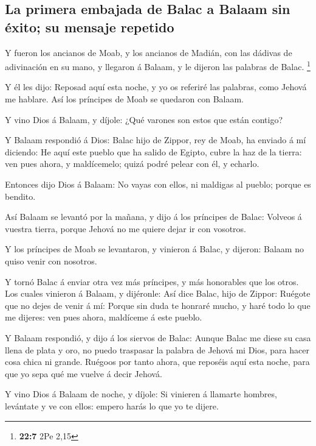\hypertarget{la-primera-embajada-de-balac-a-balaam-sin-uxe9xito-su-mensaje-repetido}{%
\subsection{La primera embajada de Balac a Balaam sin éxito; su mensaje
repetido}\label{la-primera-embajada-de-balac-a-balaam-sin-uxe9xito-su-mensaje-repetido}}

 Y fueron los ancianos de Moab, y los ancianos de Madián,
con las dádivas de adivinación en su mano, y llegaron á Balaam, y le
dijeron las palabras de Balac. \footnote{\textbf{22:7} 2Pe 2,15}

 Y él les dijo: Reposad aquí esta noche, y yo os referiré
las palabras, como Jehová me hablare. Así los príncipes de Moab se
quedaron con Balaam.

 Y vino Dios á Balaam, y díjole: ¿Qué varones son estos
que están contigo?

 Y Balaam respondió á Dios: Balac hijo de Zippor, rey de
Moab, ha enviado á mí diciendo:  He aquí este pueblo que
ha salido de Egipto, cubre la haz de la tierra: ven pues ahora, y
maldícemelo; quizá podré pelear con él, y echarlo.

 Entonces dijo Dios á Balaam: No vayas con ellos, ni
maldigas al pueblo; porque es bendito.

 Así Balaam se levantó por la mañana, y dijo á los
príncipes de Balac: Volveos á vuestra tierra, porque Jehová no me quiere
dejar ir con vosotros.

 Y los príncipes de Moab se levantaron, y vinieron á
Balac, y dijeron: Balaam no quiso venir con nosotros.

 Y tornó Balac á enviar otra vez más príncipes, y más
honorables que los otros.  Los cuales vinieron á Balaam,
y dijéronle: Así dice Balac, hijo de Zippor: Ruégote que no dejes de
venir á mí:  Porque sin duda te honraré mucho, y haré
todo lo que me dijeres: ven pues ahora, maldíceme á este pueblo.

 Y Balaam respondió, y dijo á los siervos de Balac:
Aunque Balac me diese su casa llena de plata y oro, no puedo traspasar
la palabra de Jehová mi Dios, para hacer cosa chica ni grande.
 Ruégoos por tanto ahora, que reposéis aquí esta noche,
para que yo sepa qué me vuelve á decir Jehová.

 Y vino Dios á Balaam de noche, y díjole: Si vinieren á
llamarte hombres, levántate y ve con ellos: empero harás lo que yo te
dijere.

